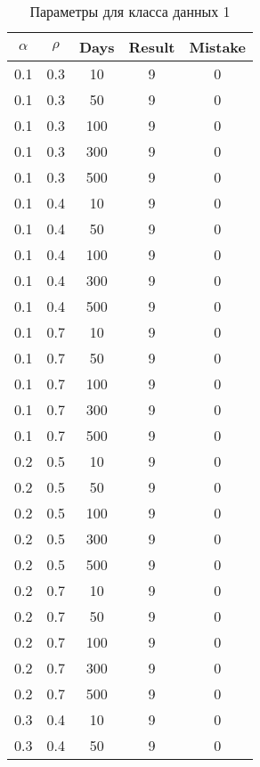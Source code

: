 \begin{center}
    \captionsetup{justification=raggedright,singlelinecheck=off}
    \begin{longtable}[c]{|c|c|c|c|c|}
    \caption{Параметры для класса данных 1\label{tbl:table_kd1}}\\ \hline
        $\alpha$ & $\rho$ & Days & Result & Mistake \\ \hline
        0.1 & 0.3 &  10 &    9 &    0 \\
        0.1 & 0.3 &  50 &    9 &    0 \\
        0.1 & 0.3 & 100 &    9 &    0 \\
        0.1 & 0.3 & 300 &    9 &    0 \\
        0.1 & 0.3 & 500 &    9 &    0 \\ \hline
        0.1 & 0.4 &  10 &    9 &    0 \\
        0.1 & 0.4 &  50 &    9 &    0 \\
        0.1 & 0.4 & 100 &    9 &    0 \\
        0.1 & 0.4 & 300 &    9 &    0 \\
        0.1 & 0.4 & 500 &    9 &    0 \\ \hline
        0.1 & 0.7 &  10 &    9 &    0 \\
        0.1 & 0.7 &  50 &    9 &    0 \\
        0.1 & 0.7 & 100 &    9 &    0 \\
        0.1 & 0.7 & 300 &    9 &    0 \\
        0.1 & 0.7 & 500 &    9 &    0 \\ \hline
        0.2 & 0.5 &  10 &    9 &    0 \\
        0.2 & 0.5 &  50 &    9 &    0 \\
        0.2 & 0.5 & 100 &    9 &    0 \\
        0.2 & 0.5 & 300 &    9 &    0 \\
        0.2 & 0.5 & 500 &    9 &    0 \\ \hline
        0.2 & 0.7 &  10 &    9 &    0 \\
        0.2 & 0.7 &  50 &    9 &    0 \\
        0.2 & 0.7 & 100 &    9 &    0 \\
        0.2 & 0.7 & 300 &    9 &    0 \\
        0.2 & 0.7 & 500 &    9 &    0 \\ \hline
        0.3 & 0.4 &  10 &    9 &    0 \\
        0.3 & 0.4 &  50 &    9 &    0 \\

\end{longtable}
\end{center}

